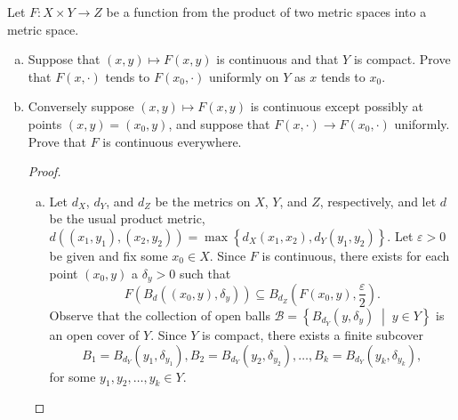 \documentclass[12pt]{amsart}
\begin{document}
\begin{setup}
  Let $F \colon X \times Y \rightarrow Z$ be a function from the product of two metric spaces into a metric space.
  \begin{enumerate}[(a)]
  \item
    Suppose that $(x,y) \mapsto F(x,y)$ is continuous and that $Y$ is compact.
    Prove that $F(x,\cdot)$ tends to $F(x_0, \cdot)$ uniformly on $Y$ as $x$ tends to $x_0$.
  \item
    Conversely suppose $(x,y) \mapsto F(x,y)$ is continuous except possibly at points $(x,y) = (x_0, y)$, and suppose that $F(x, \cdot) \rightarrow F(x_0, \cdot)$ uniformly.
    Prove that $F$ is continuous everywhere.
    \begin{proof}
      \begin{enumerate}[(a)]
        \item
          Let $d_X$, $d_Y$, and $d_Z$ be the metrics on $X$, $Y$, and $Z$, respectively, and let $d$ be the usual product metric, $d((x_1,y_1), (x_2,y_2)) = \max \left\{d_X(x_1, x_2), d_Y(y_1, y_2)\right\}$.
          Let $\varepsilon > 0$ be given and fix some $x_0 \in X$.
          Since $F$ is continuous, there exists for each point $(x_0, y)$ a $\delta_y > 0$ such that 
          $$F\left(B_d \left( \left(x_0,y\right), \delta_y\right)\right)\subseteq B_{d_Z}\left(F \left(x_0, y\right), \frac{\varepsilon}{2}\right).$$
          Observe that the collection of open balls $\mathcal{B} = \left\{B_{d_Y}(y, \delta_y) \;\middle\vert\; y \in Y\right\}$ is an open cover of $Y$.
          Since $Y$ is compact, there exists a finite subcover 
          $$B_1 = B_{d_Y}\left(y_1, \delta_{y_1}\right), B_2 = B_{d_Y}\left(y_2, \delta_{y_2}\right), \ldots, B_k = B_{d_Y}\left(y_k, \delta_{y_k}\right),$$ 
          for some $y_1, y_2, \ldots, y_k \in Y$.
          

\end{enumerate}
\end{proof}
\end{enumerate}
\end{setup}
\end{document}
